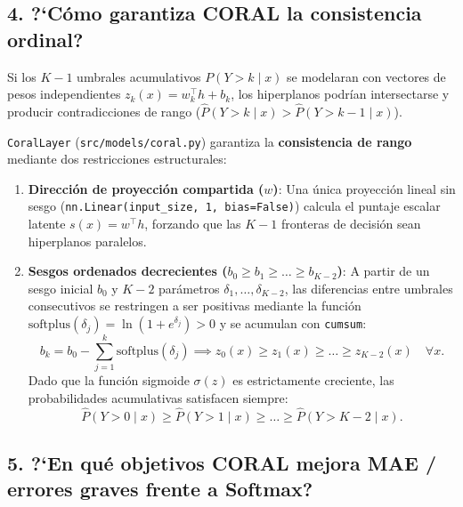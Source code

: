 \documentclass[11pt,a4paper]{article}
\begin{document}
\subsection{4. ?`C\'omo garantiza CORAL la consistencia ordinal?}

Si los $K-1$ umbrales acumulativos $P(Y > k \mid x)$ se modelaran con vectores de pesos independientes $z_k(x) = w_k^\top h + b_k$, los hiperplanos podr\'ian intersectarse y producir contradicciones de rango ($\hat{P}(Y > k \mid x) > \hat{P}(Y > k-1 \mid x)$).

\texttt{CoralLayer} (\texttt{src/models/coral.py}) garantiza la \textbf{consistencia de rango} mediante dos restricciones estructurales:
\begin{enumerate}
    \item \textbf{Direcci\'on de proyecci\'on compartida ($w$)}: Una \'unica proyecci\'on lineal sin sesgo (\texttt{nn.Linear(input\_size, 1, bias=False)}) calcula el puntaje escalar latente $s(x) = w^\top h$, forzando que las $K-1$ fronteras de decisi\'on sean hiperplanos paralelos.
    \item \textbf{Sesgos ordenados decrecientes ($b_0 \ge b_1 \ge \dots \ge b_{K-2}$)}: A partir de un sesgo inicial $b_0$ y $K-2$ par\'ametros $\delta_1, \dots, \delta_{K-2}$, las diferencias entre umbrales consecutivos se restringen a ser positivas mediante la funci\'on $\text{softplus}(\delta_j) = \ln(1 + e^{\delta_j}) > 0$ y se acumulan con \texttt{cumsum}:
    \begin{equation}
        b_k = b_0 - \sum_{j=1}^{k} \text{softplus}(\delta_j) \implies z_0(x) \ge z_1(x) \ge \dots \ge z_{K-2}(x) \quad \forall x.
    \end{equation}
    Dado que la funci\'on sigmoide $\sigma(z)$ es estrictamente creciente, las probabilidades acumulativas satisfacen siempre:
    \begin{equation}
        \hat{P}(Y > 0 \mid x) \ge \hat{P}(Y > 1 \mid x) \ge \dots \ge \hat{P}(Y > K-2 \mid x).
    \end{equation}
\end{enumerate}

\subsection{5. ?`En qu\'e objetivos CORAL mejora MAE / errores graves frente a Softmax?}
\end{document}
